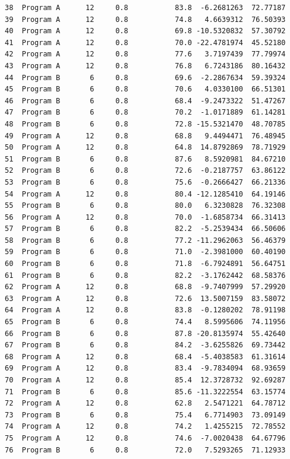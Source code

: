 \documentclass[
  letterpaper,
  DIV=11,
  numbers=noendperiod]{scrreprt}
\begin{document}
\begin{verbatim}
38  Program A      12     0.8           83.8  -6.2681263  72.77187
39  Program A      12     0.8           74.8   4.6639312  76.50393
40  Program A      12     0.8           69.8 -10.5320832  57.30792
41  Program A      12     0.8           70.0 -22.4781974  45.52180
42  Program A      12     0.8           77.6   3.7197439  77.79974
43  Program A      12     0.8           76.8   6.7243186  80.16432
44  Program B       6     0.8           69.6  -2.2867634  59.39324
45  Program B       6     0.8           70.6   4.0330100  66.51301
46  Program B       6     0.8           68.4  -9.2473322  51.47267
47  Program B       6     0.8           70.2  -1.0171889  61.14281
48  Program B       6     0.8           72.8 -15.5321470  48.70785
49  Program A      12     0.8           68.8   9.4494471  76.48945
50  Program A      12     0.8           64.8  14.8792869  78.71929
51  Program B       6     0.8           87.6   8.5920981  84.67210
52  Program B       6     0.8           72.6  -0.2187757  63.86122
53  Program B       6     0.8           75.6  -0.2666427  66.21336
54  Program A      12     0.8           80.4 -12.1285410  64.19146
55  Program B       6     0.8           80.0   6.3230828  76.32308
56  Program A      12     0.8           70.0  -1.6858734  66.31413
57  Program B       6     0.8           82.2  -5.2539434  66.50606
58  Program B       6     0.8           77.2 -11.2962063  56.46379
59  Program B       6     0.8           71.0  -2.3981000  60.40190
60  Program B       6     0.8           71.8  -6.7924891  56.64751
61  Program B       6     0.8           82.2  -3.1762442  68.58376
62  Program A      12     0.8           68.8  -9.7407999  57.29920
63  Program A      12     0.8           72.6  13.5007159  83.58072
64  Program A      12     0.8           83.8  -0.1280202  78.91198
65  Program B       6     0.8           74.4   8.5995606  74.11956
66  Program B       6     0.8           87.8 -20.8135974  55.42640
67  Program B       6     0.8           84.2  -3.6255826  69.73442
68  Program A      12     0.8           68.4  -5.4038583  61.31614
69  Program A      12     0.8           83.4  -9.7834094  68.93659
70  Program A      12     0.8           85.4  12.3728732  92.69287
71  Program B       6     0.8           85.6 -11.3222554  63.15774
72  Program A      12     0.8           62.8   2.5471221  64.78712
73  Program B       6     0.8           75.4   6.7714903  73.09149
74  Program A      12     0.8           74.2   1.4255215  72.78552
75  Program A      12     0.8           74.6  -7.0020438  64.67796
76  Program B       6     0.8           72.0   7.5293265  71.12933

\end{verbatim}
\end{document}
